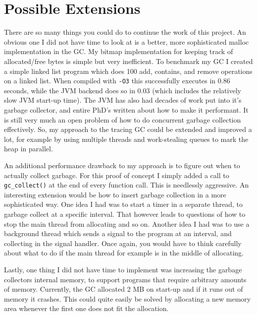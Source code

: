 \section{Possible Extensions}
There are so many things you could do to continue the work of this project. An obvious one I did not have time to look at is a better, more sophisticated malloc implementation in the GC. My bitmap implementation for keeping track of allocated/free bytes is simple but very inefficient. To benchmark my GC I created a simple linked list program which does 100 add, contains, and remove operations on a linked list. When compiled with \texttt{-O3} this successfully executes in 0.86 seconds, while the JVM backend does so in 0.03 (which includes the relatively slow JVM start-up time). The JVM has also had decades of work put into it's garbage collector, and entire PhD's written about how to make it performant. It is still very much an open problem of how to do concurrent garbage collection effectively. So, my approach to the tracing GC could be extended and improved a lot, for example by using multiple threads and work-stealing queues to mark the heap in parallel.

An additional performance drawback to my approach is to figure out when to actually collect garbage. For this proof of concept I simply added a call to \texttt{gc\_collect()} at the end of every function call. This is needlessly aggressive. An interesting extension would be how to insert garbage collection in a more sophisticated way. One idea I had was to start a timer in a separate thread, to garbage collect at a specific interval. That however leads to questions of how to stop the main thread from allocating and so on. Another idea I had was to use a background thread which sends a signal to the program at an interval, and collecting in the signal handler. Once again, you would have to think carefully about what to do if the main thread for example is in the middle of allocating.

Lastly, one thing I did not have time to implement was increasing the garbage collectors internal memory, to support programs that require arbitrary amounts of memory. Currently, the GC allocated 2 MB on start-up and if it runs out of memory it crashes. This could quite easily be solved by allocating a new memory area whenever the first one does not fit the allocation.
